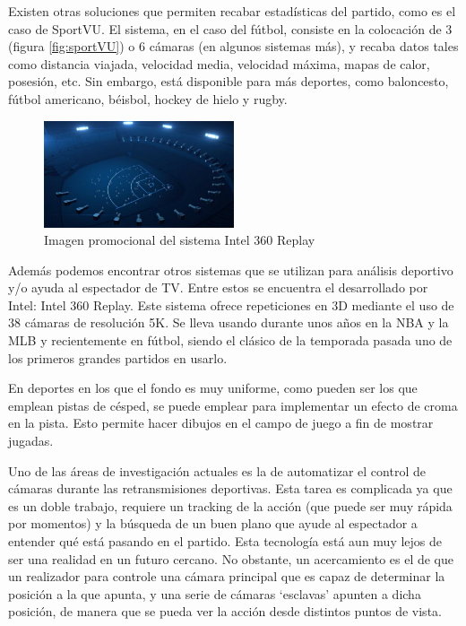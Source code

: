 Existen otras soluciones que permiten recabar estadísticas del partido, como es el caso de SportVU. El sistema, en el caso del fútbol, consiste en la colocación de 3 (figura \ref{fig:sportVU}) o 6 cámaras (en algunos sistemas más), y recaba datos tales como distancia viajada, velocidad media, velocidad máxima, mapas de calor, posesión, etc. Sin embargo, está disponible para más deportes, como baloncesto, fútbol americano, béisbol, hockey de hielo y rugby.

\begin{figure}
    \centering
    \includegraphics[width=0.5\textwidth]{images/intel360}
    \caption{Imagen promocional del sistema Intel 360 Replay}
    \label{fig:intel360}
\end{figure}

Además podemos encontrar otros sistemas que se utilizan para análisis deportivo y/o ayuda al espectador de TV. Entre estos se encuentra el desarrollado por Intel: Intel 360 Replay. Este sistema ofrece repeticiones en 3D mediante el uso de 38 cámaras de resolución 5K. Se lleva usando durante unos años en la NBA y la MLB y recientemente en fútbol, siendo el clásico de la temporada pasada uno de los primeros grandes partidos en usarlo.

En deportes en los que el fondo es muy uniforme, como pueden ser los que emplean pistas de césped, se puede emplear para implementar un efecto de croma en la pista. Esto permite hacer dibujos en el campo de juego a fin de mostrar jugadas.

Uno de las áreas de investigación actuales es la de automatizar el control de cámaras durante las retransmisiones deportivas. Esta tarea es complicada ya que es un doble trabajo, requiere un tracking de la acción (que puede ser muy rápida por momentos) y la búsqueda de un buen plano que ayude al espectador a entender qué está pasando en el partido. Esta tecnología está aun muy lejos de ser una realidad en un futuro cercano. No obstante, un acercamiento es el de que un realizador para controle una cámara principal que es capaz de determinar la posición a la que apunta, y una serie de cámaras `esclavas' apunten a dicha posición, de manera que se pueda ver la acción desde distintos puntos de vista. \cite{book:cvInSports}